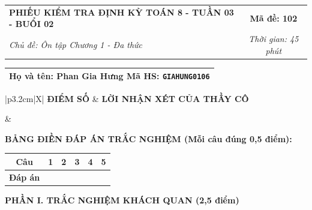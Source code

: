 \documentclass[12pt,a4paper]{article}
\begin{document}
\newpage


\noindent
\begin{tabularx}{\linewidth}{|X|c|}
\hline
\textbf{PHIẾU KIỂM TRA ĐỊNH KỲ TOÁN 8 - TUẦN 03 - BUỔI 02} & \textbf{Mã đề: 102} \\
\textit{Chủ đề: Ôn tập Chương 1 - Đa thức} & \textit{Thời gian: 45 phút} \\
\hline
\end{tabularx}

\vspace{1mm}

\noindent
\begin{tabularx}{\linewidth}{|X|}
\hline
\rule[-2mm]{0pt}{7.5mm}\textbf{Họ và tên:} \textbf{\large Phan Gia Hưng} \hfill \textbf{Mã HS:} \texttt{GIAHUNG0106} \quad \\
\hline
\end{tabularx}

\vspace{1mm}

\noindent
\begin{tabularx}{\linewidth}{|p{3.2cm}|X|}
\hline
\centering\textbf{ĐIỂM SỐ} & \centering\textbf{LỜI NHẬN XÉT CỦA THẦY CÔ} \tabularnewline
\hline
\rule{0pt}{1.3cm} & \tabularnewline
\hline
\end{tabularx}

\vspace{1.2mm}

\noindent\textbf{BẢNG ĐIỀN ĐÁP ÁN TRẮC NGHIỆM (Mỗi câu đúng 0,5 điểm):}
\vspace{0.8mm}

\noindent
\renewcommand{\arraystretch}{1.35}
\begin{tabularx}{\linewidth}{|c|*{5}{>{\centering\arraybackslash}X|}}
\hline
\textbf{Câu} & \textbf{1} & \textbf{2} & \textbf{3} & \textbf{4} & \textbf{5} \\
\hline
\textbf{Đáp án} & & & & & \\
\hline
\end{tabularx}
\renewcommand{\arraystretch}{1.0}

\vspace{1.5mm}

\noindent\textbf{\large PHẦN I. TRẮC NGHIỆM KHÁCH QUAN (2,5 điểm)}
\vspace{1mm}
\end{document}
